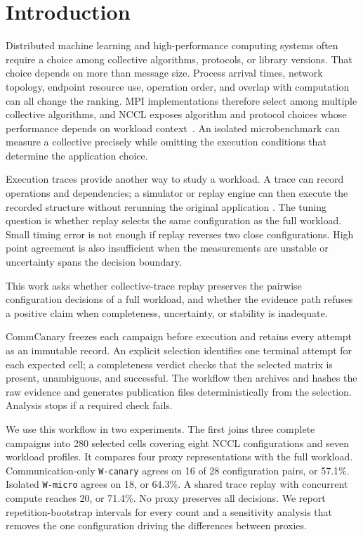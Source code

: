\documentclass[10pt,twocolumn]{article}
\newcommand{\wname}[1]{\texttt{W-#1}}
\begin{document}
\section{Introduction}

Distributed machine learning and high-performance computing systems often
require a choice among collective algorithms, protocols, or library versions.
That choice depends on more than message size. Process arrival times, network
topology, endpoint resource use, operation order, and overlap with computation
can all change the ranking. MPI implementations therefore select among
multiple collective algorithms, and NCCL exposes algorithm and protocol
choices whose performance depends on workload context~\cite{mpi,nccl,thakur,vadhiyar}.
An isolated microbenchmark can measure a collective precisely while omitting
the execution conditions that determine the application choice.

Execution traces provide another way to study a workload. A trace can record
operations and dependencies; a simulator or replay engine can then execute the
recorded structure without rerunning the original application
\cite{chakra,mystique,astrasim,astrasim2,scalatrace,loggopsim}. The tuning
question is whether replay selects the same configuration as the full
workload. Small timing error is not enough if replay
reverses two close configurations. High point agreement is also insufficient
when the measurements are unstable or uncertainty spans the decision boundary.

This work asks whether collective-trace replay preserves the pairwise
configuration decisions of a full workload, and whether the evidence path
refuses a positive claim when completeness, uncertainty, or stability is
inadequate.

CommCanary freezes each campaign before execution and retains every attempt
as an immutable record. An explicit selection identifies one terminal attempt
for each expected cell; a completeness verdict checks that the selected matrix
is present, unambiguous, and successful. The workflow then archives and hashes
the raw evidence and generates publication files deterministically from the
selection. Analysis stops if a required check fails.

We use this workflow in two experiments. The first joins three complete
campaigns into 280 selected cells covering eight NCCL configurations and seven
workload profiles. It compares four proxy representations with the full
workload. Communication-only \wname{canary} agrees on 16 of 28 configuration
pairs, or 57.1\%. Isolated \wname{micro} agrees on 18, or 64.3\%. A shared trace
replay with concurrent compute reaches 20, or 71.4\%. No proxy preserves all
decisions. We report repetition-bootstrap intervals for every count and a
sensitivity analysis that removes the one configuration driving the
differences between proxies.
\end{document}
